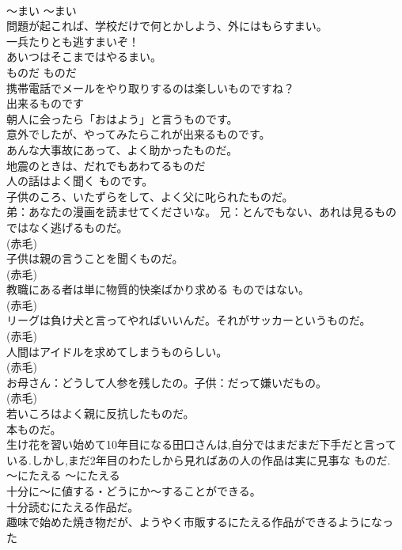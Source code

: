 \documentclass[8pt]{extreport}
\begin{document}
\begin{CJK}{UTF8}{min}
\\	〜まい	〜まい	
\\	問題が起これば、学校だけで何とかしよう、外にはもらすまい。  
\\	一兵たりとも逃すまいぞ！
\\	あいつはそこまではやるまい。  
\\	ものだ	ものだ	
\\	携帯電話でメールをやり取りするのは楽しいものですね？  
\\	出来るものです  
\\	朝人に会ったら「おはよう」と言うものです。  
\\	意外でしたが、やってみたらこれが出来るものです。  
\\	あんな大事故にあって、よく助かったものだ。   
\\	地震のときは、だれでもあわてるものだ   
\\	人の話はよく聞く ものです。  
\\	子供のころ、いたずらをして、よく父に叱られたものだ。   
\\	弟：あなたの漫画を読ませてくださいな。 兄：とんでもない、あれは見るものではなく逃げるものだ。  
\\	(赤毛)
\\	子供は親の言うことを聞くものだ。  
\\	(赤毛)
\\	教職にある者は単に物質的快楽ばかり求める ものではない。  
\\	(赤毛)
\\	リーグは負け犬と言ってやればいいんだ。それがサッカーというものだ。  
\\	(赤毛)
\\	人間はアイドルを求めてしまうものらしい。  
\\	(赤毛)
\\	お母さん：どうして人参を残したの。子供：だって嫌いだもの。  
\\	(赤毛)
\\	若いころはよく親に反抗したものだ。  
\\	本ものだ。  
\\	生け花を習い始めて10年目になる田口さんは,自分ではまだまだ下手だと言っている.しかし,まだ2年目のわたしから見ればあの人の作品は実に見事な ものだ.  
\\	〜にたえる	〜にたえる	
\\	十分に〜に値する・どうにか〜することができる。	
\\	十分読むにたえる作品だ。  
\\	趣味で始めた焼き物だが、ようやく市販するにたえる作品ができるようになった  

\end{CJK}
\end{document}

